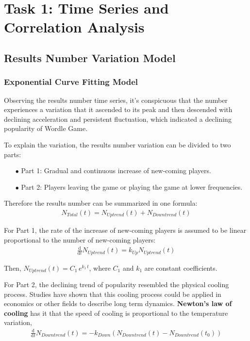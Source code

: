 \section{Task 1: Time Series and Correlation Analysis}
\subsection{Results Number Variation Model}
\subsubsection{Exponential Curve Fitting Model}
Observing the results number time series, it's conspicuous that the number experiences a variation that it ascended to its peak and then descended with declining acceleration and persistent fluctuation, which indicated a declining popularity of Wordle Game.

To explain the variation, the results number variation can be divided to two parts:

\begin{itemize}
\item [$\bullet$]Part 1: Gradual and continuous increase of new-coming players.
\item [$\bullet$]Part 2: Players leaving the game or playing the game at lower frequencies.

\end{itemize}

Therefore the results number can be summarized in one formula: 
\begin{align}
    N_{Total}(t)=N_{Uptrend}(t)+N_{Downtrend}(t)
\end{align}
\par For Part 1, the rate of the increase of new-coming players is assumed to be linear proportional to the number of new-coming players:
\begin{align}
    \frac{\mathrm{d}}{\mathrm{d}t}N_{Uptrend}(t)=k_{Up}N_{Uptrend}(t)
\end{align}

Then, $N_{Uptrend}(t)=C_{1}\,e^{k_{1}\,t}$, where $C_{1}$ and $k_{1}$ are constant coefficients.

    


For Part 2, the declining trend of popularity resembled the physical cooling process. Studies have shown that this cooling process could be applied in economics or other fields to describe long term dynamics\cite{article2}. \textbf{Newton's law of cooling} has it that the speed of cooling is proportional to the temperature variation, 
\begin{align}
    \frac{\mathrm{d}}{\mathrm{d}t}N_{Downtrend}(t)=-k_{Down}(N_{Downtrend}(t)-N_{Downtrend}(t_0))
\end{align}

